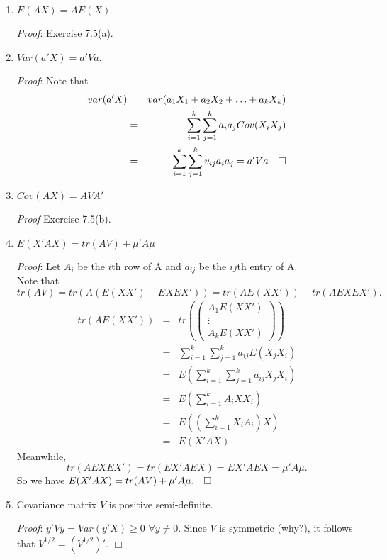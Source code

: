 \documentclass[12pt,oneside]{article}
\begin{document}
\begin{enumerate}
\item $E(AX) = A E(X)$

\emph{Proof}: Exercise 7.5(a).

\item $Var(a'X) = a'Va$.

\emph{Proof}: Note that  \begin{eqnarray*} var(a'X) &=& var(a_1 X_1 + a_2 X_2 + \ldots + a_k X_k) \\ &=& \displaystyle\sum_{i=1}^k {\displaystyle\sum_{j=1}^k {a_i a_j
  Cov(X_i X_j)}}  \\ &=& \displaystyle\sum_{i=1}^k
  {\displaystyle\sum_{j=1}^k {v_{ij} a_i a_j}} = a'Va \hspace{10 pt} \Box \end{eqnarray*}

\item $Cov(AX) = AVA'$

\emph{Proof} Exercise 7.5(b).

\item $E(X'AX) = tr(AV) + \mu' A \mu$

\emph{Proof}: Let $A_i$ be the $i$th row of A and $a_{ij}$ be the $ij$th entry of A. \\
Note that 
$tr(AV)=tr(A(E(XX')-EXEX'))=tr(AE(XX'))-tr(AEXEX'). $
\begin{eqnarray*}
tr(AE(XX'))&=& tr\left(\begin{pmatrix} A_1E(XX')\\ \vdots \\ A_kE(XX')  \end{pmatrix}  \right)\\
	&=& \sum_{i=1}^k\sum_{j=1}^k a_{ij}E(X_jX_i)\\
	&=&E\left(\sum_{i=1}^k\sum_{j=1}^k a_{ij}X_jX_i \right)\\
	&=&E\left(\sum_{i=1}^k A_iXX_i\right)\\
	&=&E\left(\left(\sum_{i=1}^k X_iA_i\right)X\right)\\
	&=&E(X'AX) 
\end{eqnarray*}
Meanwhile, 
$$tr(AEXEX')=tr(EX'AEX)=EX'AEX=\mu' A\mu. $$
So we have $E(X'AX) = tr(AV) + \mu' A \mu. \hspace{10 pt} \Box$


\item Covariance matrix $V$ is positive semi-definite.

\emph{Proof}: $y'Vy =  Var(y'X) \geq 0 $ $\forall y \neq 0$. Since $V$ is symmetric (why?), it follows that $V^{1/2} = (V^{1/2})'$. $\Box$


\end{enumerate}
\end{document}

